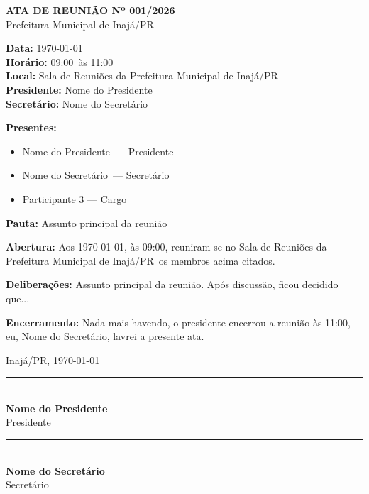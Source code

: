 \documentclass[12pt,a4paper]{article}
\newcommand{\municipio}{Inajá}
\newcommand{\uf}{PR}
\newcommand{\prefeitura}{Prefeitura Municipal de \municipio/\uf}
\newcommand{\numeroAta}{001/2026}
\newcommand{\dataReuniao}{\today}
\newcommand{\horaInicio}{09:00}
\newcommand{\horaFim}{11:00}
\newcommand{\localReuniao}{Sala de Reuniões da \prefeitura}
\newcommand{\presidenteReuniao}{Nome do Presidente}
\newcommand{\secretarioReuniao}{Nome do Secretário}
\newcommand{\pauta}{Assunto principal da reunião}
\newcommand{\participantes}{
  \begin{itemize}[noitemsep]
    \item \presidenteReuniao\ — Presidente
    \item \secretarioReuniao\ — Secretário
    \item Participante 3 — Cargo
  \end{itemize}
}
\newcommand{\textoAta}{
  \textbf{Abertura:} Aos \dataReuniao, às \horaInicio, reuniram-se no \localReuniao\ os membros acima citados.

  \vspace{0.3cm}

  \textbf{Deliberações:} \pauta. Após discussão, ficou decidido que...

  \vspace{0.3cm}

  \textbf{Encerramento:} Nada mais havendo, o presidente encerrou a reunião às \horaFim, eu, \secretarioReuniao, lavrei a presente ata.
}
\begin{document}
\begin{center}
  \Large\textbf{ATA DE REUNIÃO Nº \numeroAta} \\
  \large\prefeitura
\end{center}

\vspace{0.8cm}

\noindent
\textbf{Data:} \dataReuniao \\
\textbf{Horário:} \horaInicio\ às \horaFim \\
\textbf{Local:} \localReuniao \\
\textbf{Presidente:} \presidenteReuniao \\
\textbf{Secretário:} \secretarioReuniao

\vspace{0.5cm}

\noindent
\textbf{Presentes:}
\participantes

\vspace{0.5cm}

\noindent
\textbf{Pauta:} \pauta

\vspace{0.8cm}

\textoAta

\vspace{1.5cm}

\begin{flushright}
  \municipio/\uf, \dataReuniao
\end{flushright}

\vspace{1.5cm}

\begin{minipage}[t]{0.45\textwidth}
  \centering
  \rule{6cm}{0.4pt} \\
  \textbf{\presidenteReuniao} \\
  Presidente
\end{minipage}
\hfill
\begin{minipage}[t]{0.45\textwidth}
  \centering
  \rule{6cm}{0.4pt} \\
  \textbf{\secretarioReuniao} \\
  Secretário
\end{minipage}
\end{document}

